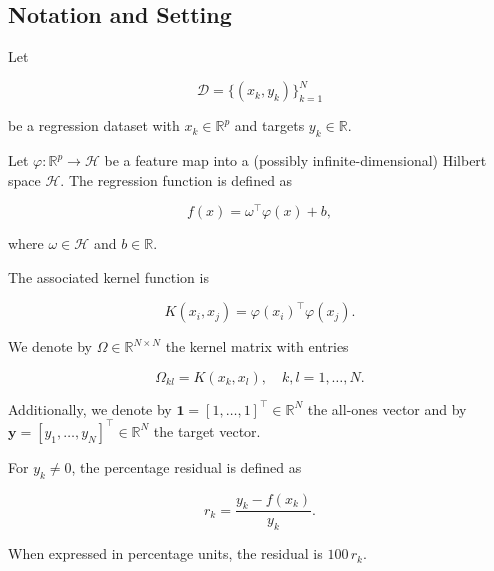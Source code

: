 \documentclass[mathematics,article,submit,pdftex,moreauthors]{Definitions/mdpi}
\begin{document}
\subsection{Notation and Setting}\label{subsec:notation}

Let 
\begin{linenomath}
\begin{equation}\label{eq:dataset_def}
\mathcal{D} = \{(x_k, y_k)\}_{k=1}^N
\end{equation}
\end{linenomath}
be a regression dataset with $x_k \in \mathbb{R}^p$ and targets $y_k \in \mathbb{R}$.

Let $\varphi : \mathbb{R}^p \to \mathcal{H}$ be a feature map into a (possibly infinite-dimensional) Hilbert space $\mathcal{H}$. 
The regression function is defined as
\begin{linenomath}
\begin{equation}\label{eq:regression_function}
f(x) = \omega^\top \varphi(x) + b,
\end{equation}
\end{linenomath}
where $\omega \in \mathcal{H}$ and $b \in \mathbb{R}$.

The associated kernel function is
\begin{linenomath}
\begin{equation}\label{eq:kernel_def}
K(x_i, x_j) = \varphi(x_i)^\top \varphi(x_j).
\end{equation}
\end{linenomath}

We denote by $\Omega \in \mathbb{R}^{N \times N}$ the kernel matrix with entries
\begin{linenomath}
\begin{equation}\label{eq:Omega_def}
\Omega_{kl} = K(x_k,x_l), \quad k,l = 1,\ldots,N.
\end{equation}
\end{linenomath}

Additionally, we denote by $\mathbf{1} = [1,\ldots,1]^\top \in \mathbb{R}^N$ the all-ones vector 
and by $\mathbf{y} = [y_1,\ldots,y_N]^\top \in \mathbb{R}^N$ the target vector.

\begin{Definition}\label{def:percentage_residual}
For $y_k \neq 0$, the percentage residual is defined as
\begin{linenomath}
\begin{equation}\label{eq:percentage_residual}
r_k = \frac{y_k - f(x_k)}{y_k}.
\end{equation}
\end{linenomath}
When expressed in percentage units, the residual is $100\,r_k$.
\end{Definition}
\end{document}
